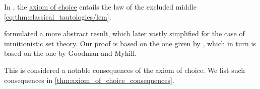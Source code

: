 \begin{theorem}\label{thm:diaconescu_goodman_myhill_theorem}
  In \hyperref[def:zfc]{}, the \hyperref[def:zfc/choice]{axiom of choice} entails the law of the excluded middle \eqref{eq:thm:classical_tautologies/lem}.
\end{theorem}
\begin{comments}
  \item \Textcite[corr. 2]{Diaconescu1975AxiomOfChoice} formulated a more abstract result, which \textcite{GoodmanMyhill1978AxiomOfChoice} later vastly simplified for the case of intuitionistic set theory. Our proof is based on the one given by \textcite[thm. 5.3.3.6]{Mimram2020ProgramEqualsProof}, which in turn is based on the one by Goodman and Myhill.

  \item This is considered a notable consequences of the axiom of choice. We list such consequences in \cref{thm:axiom_of_choice_consequences}.
\end{comments}
